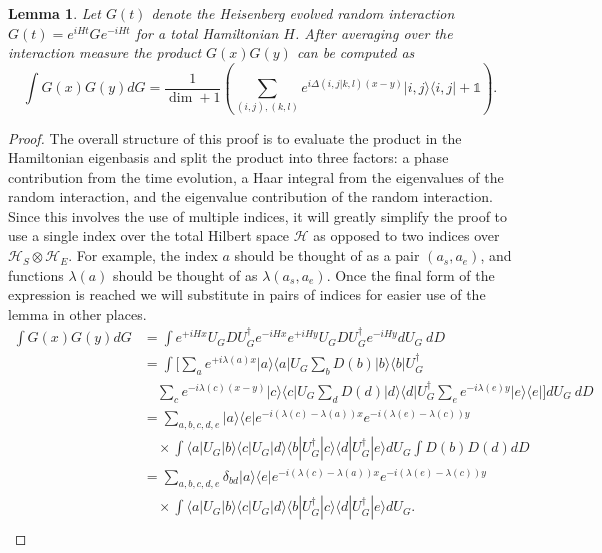 \documentclass{article}
\newtheorem{lemma}[theorem]{Lemma}
\newcommand{\ket}[1]{|#1\rangle}
\newcommand{\bra}[1]{\langle #1|}
\newcommand{\ketbra}[2]{| #1\rangle\! \langle #2|}
\newcommand{\parens}[1]{\left( #1 \right)}
\newcommand{\hilb}{\mathcal{H}}
\newcommand{\identity}{\mathds{1}}
\begin{document}
\begin{lemma} \label{lem:two_heisenberg_interactions}
    Let $G(t)$ denote the Heisenberg evolved random interaction $G(t) = e^{iHt} G e^{-iHt}$ for a total Hamiltonian $H$. After averaging over the interaction measure the product $G(x) G(y)$ can be computed as
    \begin{equation}
        \int G(x) G(y) dG = \frac{1}{\dim + 1} \parens{\sum_{(i,j),(k,l)} e^{i \Delta(i,j|k,l) (x-y)} \ketbra{i,j}{i,j} + \identity}.
    \end{equation}
\end{lemma}
\begin{proof}
The overall structure of this proof is to evaluate the product in the Hamiltonian eigenbasis and split the product into three factors: a phase contribution from the time evolution, a Haar integral from the eigenvalues of the random interaction, and the eigenvalue contribution of the random interaction. Since this involves the use of multiple indices, it will greatly simplify the proof to use a single index over the total Hilbert space $\hilb$ as opposed to two indices over $\hilb_S \otimes \hilb_E$. For example, the index $a$ should be thought of as a pair $(a_s, a_e)$, and functions $\lambda(a)$ should be thought of as $\lambda(a_s, a_e)$. Once the final form of the expression is reached we will substitute in pairs of indices for easier use of the lemma in other places.
    \begin{align}
        \int G(x) G(y) dG &= \int e^{+i H x} U_G D U_G^\dagger e^{-i H x} e^{+i H y} U_G D U_G^\dagger e^{-i H y} dU_G ~dD \\
        &= \int \bigg[\sum_a e^{+i \lambda(a)x}\ketbra{a}{a}  U_G \sum_b D(b)\ketbra{b}{b} U_G^\dagger \nonumber \\
        &\quad \sum_c e^{-i \lambda(c) (x - y)} \ketbra{c}{c} U_G \sum_d D(d)\ketbra{d}{d} U_G^\dagger \sum_e e^{-i \lambda(e) y} \ketbra{e}{e} \bigg] dU_G ~dD\\
        &=\sum_{a,b,c,d,e} \ketbra{a}{e} e^{-i (\lambda(c) - \lambda(a))x} e^{-i (\lambda(e) - \lambda(c))y} \nonumber \\
        &\quad \times \int \bra{a} U_G \ket{b} \bra{c} U_G \ket{d} \bra{b} U_G^{\dagger} \ket{c} \bra{d} U_G^\dagger \ket{e} dU_G \int D(b) D(d) dD \\
        &=  \sum_{a, b, c, d, e} \delta_{bd} \ketbra{a}{e} e^{-i (\lambda(c) - \lambda(a))x} e^{-i (\lambda(e) - \lambda(c))y} \nonumber \\
        &\quad \times \int \bra{a} U_G \ket{b} \bra{c} U_G \ket{d} \bra{b} U_G^{\dagger} \ket{c} \bra{d} U_G^\dagger \ket{e} dU_G. \\

\end{align}
\end{proof}
\end{document}
